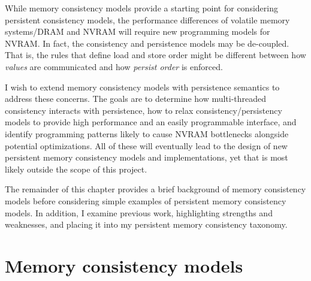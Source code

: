 While memory consistency models provide a starting point for considering persistent consistency models, the performance differences of volatile memory systems/DRAM and NVRAM will require new programming models for NVRAM.
In fact, the consistency and persistence models may be de-coupled.
That is, the rules that define load and store order might be different between how \emph{values} are communicated and how \emph{persist order} is enforced.

I wish to extend memory consistency models with persistence semantics to address these concerns.
The goals are to determine how multi-threaded consistency interacts with persistence, how to relax consistency/persistency models to provide high performance and an easily programmable interface, and identify programming patterns likely to cause NVRAM bottlenecks alongside potential optimizations.
All of these will eventually lead to the design of new persistent memory consistency models and implementations, yet that is most likely outside the scope of this project.

The remainder of this chapter provides a brief background of memory consistency models before considering simple examples of persistent memory consistency models.
In addition, I examine previous work, highlighting strengths and weaknesses, and placing it into my persistent memory consistency taxonomy.

\section{Memory consistency models}
\label{sec:PMC:MemoryConsistency}
